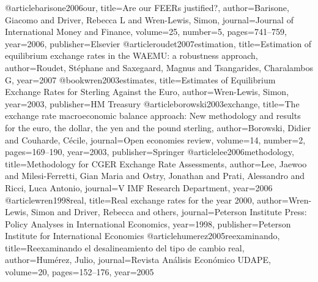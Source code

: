 @article{barisone2006our,	  
	title={Are our FEERs justified?},
	author={Barisone, Giacomo and Driver, Rebecca L and Wren-Lewis, Simon},
	journal={Journal of International Money and Finance},
	volume={25},
	number={5},
	pages={741--759},
	year={2006},
	publisher={Elsevier}
}
@article{roudet2007estimation,
	title={Estimation of equilibrium exchange rates in the WAEMU: a robustness approach},
	author={Roudet, St{\'e}phane and Saxegaard, Magnus and Tsangarides, Charalambos G},
	year={2007}
}					
@book{wren2003estimates,
	title={Estimates of Equilibrium Exchange Rates for Sterling Against the Euro},
	author={Wren-Lewis, Simon},
	year={2003},
	publisher={HM Treasury}
}				
@article{borowski2003exchange,
	title={The exchange rate macroeconomic balance approach: New methodology and results for the euro, the dollar, the yen and the pound sterling},
	author={Borowski, Didier and Couharde, C{\'e}cile},
	journal={Open economies review},
	volume={14},
	number={2},
	pages={169--190},
	year={2003},
	publisher={Springer}
}
@article{lee2006methodology,
	title={Methodology for CGER Exchange Rate Assessments},
	author={Lee, Jaewoo and Milesi-Ferretti, Gian Maria and Ostry, Jonathan and Prati, Alessandro and Ricci, Luca Antonio},	
	journal={V IMF Research Department},
	year={2006}
}				
@article{wren1998real,
	title={Real exchange rates for the year 2000},
	author={Wren-Lewis, Simon and Driver, Rebecca and others},
	journal={Peterson Institute Press: Policy Analyses in International Economics},
	year={1998},
	publisher={Peterson Institute for International Economics}
}			
@article{humerez2005reexaminando,
  title={Reexaminando el desalineamiento del tipo de cambio real},
  author={Hum{\'e}rez, Julio},
  journal={Revista An{\'a}lisis Econ{\'o}mico UDAPE},
  volume={20},
  pages={152--176},
  year={2005}
}